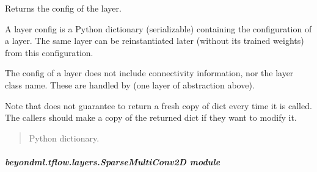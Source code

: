 \documentclass[letterpaper,10pt,english]{sphinxmanual}
\begin{document}
\begin{fulllineitems}
\begin{fulllineitems}
\end{fulllineitems}


\begin{fulllineitems}
\label{\detokenize{beyondml.tflow.layers:beyondml.tflow.layers.SparseDense.SparseDense.get_config}}
\pysigstartsignatures
{}
\pysigstopsignatures
\sphinxAtStartPar
Returns the config of the layer.

\sphinxAtStartPar
A layer config is a Python dictionary (serializable)
containing the configuration of a layer.
The same layer can be reinstantiated later
(without its trained weights) from this configuration.

\sphinxAtStartPar
The config of a layer does not include connectivity
information, nor the layer class name. These are handled
by  (one layer of abstraction above).

\sphinxAtStartPar
Note that  does not guarantee to return a fresh copy of
dict every time it is called. The callers should make a copy of the
returned dict if they want to modify it.
\begin{quote}\begin{description}
\sphinxAtStartPar
Python dictionary.

\end{description}\end{quote}

\end{fulllineitems}


\end{fulllineitems}



\subparagraph{beyondml.tflow.layers.SparseMultiConv2D module}
\label{\detokenize{beyondml.tflow.layers:module-beyondml.tflow.layers.SparseMultiConv2D}}\label{\detokenize{beyondml.tflow.layers:beyondml-tflow-layers-sparsemulticonv2d-module}}
\end{document}
